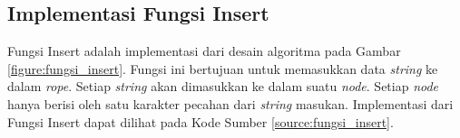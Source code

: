 



\subsection{Implementasi Fungsi Insert}
Fungsi Insert adalah implementasi dari desain algoritma pada Gambar \ref{figure:fungsi_insert}. Fungsi ini bertujuan untuk memasukkan data \textit{string} ke dalam \textit{rope}. Setiap \textit{string} akan dimasukkan ke dalam suatu \textit{node}. Setiap \textit{node} hanya berisi oleh satu karakter pecahan dari \textit{string} masukan. Implementasi dari Fungsi Insert dapat dilihat pada Kode Sumber \ref{source:fungsi_insert}.



